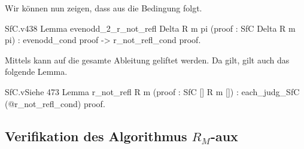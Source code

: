 Wir können nun zeigen, dass aus  die Bedingung  folgt. 
\begin{code}{SfC.v}{}{438} 
Lemma evenodd_2_r_not_refl {Delta R m pi} (proof : SfC Delta R m pi) : 
    evenodd_cond proof -> r_not_refl_cond proof.
\end{code}

Mittels  kann  auf die gesamte Ableitung geliftet werden. Da  gilt, gilt auch das folgende Lemma.
\begin{code}{SfC.v}{Siehe }{473}
Lemma r_not_refl {R m} (proof : SfC [] R m []) : 
    each_judg_SfC (@r_not_refl_cond) proof.
\end{code}

\subsection{Verifikation des Algorithmus $R_M$-aux}


